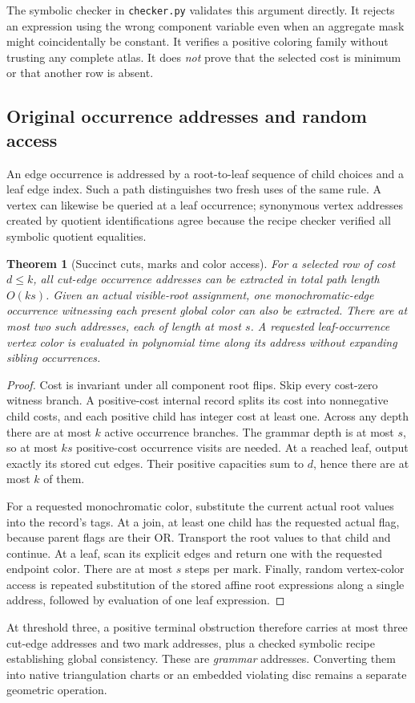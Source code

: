 \documentclass[11pt,letterpaper]{article}
\newtheorem{theorem}{Theorem}[section]
\theoremstyle{definition}
\theoremstyle{remark}\newtheorem{remark}[theorem]{Remark}
\DeclareRobustCommand{\code}[1]{\nolinkurl{#1}}
\begin{document}
The symbolic checker in \code{checker.py} validates this argument directly. It rejects an expression using the wrong component variable even when an aggregate mask might coincidentally be constant. It verifies a positive coloring family without trusting any complete atlas. It does \emph{not} prove that the selected cost is minimum or that another row is absent.

\subsection{Original occurrence addresses and random access}
An edge occurrence is addressed by a root-to-leaf sequence of child choices and a leaf edge index. Such a path distinguishes two fresh uses of the same rule. A vertex can likewise be queried at a leaf occurrence; synonymous vertex addresses created by quotient identifications agree because the recipe checker verified all symbolic quotient equalities.

\begin{theorem}[Succinct cuts, marks and color access]\label{thm:addresses}
For a selected row of cost $d\le k$, all cut-edge occurrence addresses can be extracted in total path length $O(ks)$. Given an actual visible-root assignment, one monochromatic-edge occurrence witnessing each present global color can also be extracted. There are at most two such addresses, each of length at most $s$. A requested leaf-occurrence vertex color is evaluated in polynomial time along its address without expanding sibling occurrences.
\end{theorem}
\begin{proof}
Cost is invariant under all component root flips. Skip every cost-zero witness branch. A positive-cost internal record splits its cost into nonnegative child costs, and each positive child has integer cost at least one. Across any depth there are at most $k$ active occurrence branches. The grammar depth is at most $s$, so at most $ks$ positive-cost occurrence visits are needed. At a reached leaf, output exactly its stored cut edges. Their positive capacities sum to $d$, hence there are at most $k$ of them.

For a requested monochromatic color, substitute the current actual root values into the record's tags. At a join, at least one child has the requested actual flag, because parent flags are their OR. Transport the root values to that child and continue. At a leaf, scan its explicit edges and return one with the requested endpoint color. There are at most $s$ steps per mark. Finally, random vertex-color access is repeated substitution of the stored affine root expressions along a single address, followed by evaluation of one leaf expression.
\end{proof}
At threshold three, a positive terminal obstruction therefore carries at most three cut-edge addresses and two mark addresses, plus a checked symbolic recipe establishing global consistency. These are \emph{grammar} addresses. Converting them into native triangulation charts or an embedded violating disc remains a separate geometric operation.
\end{document}
